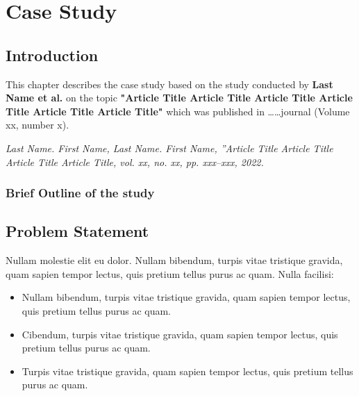 
\chapter{Case Study}\doublespacing %

\label{Chapter3} %



\section{Introduction}
This chapter describes the case study based on the study conducted by \textbf{Last Name et al.} on the topic \textbf{ "Article Title Article Title Article Title Article Title Article Title Article Title" } which was published in \ldots \ldots journal (Volume xx, number x).


\textit{Last Name. First Name, Last Name. First Name, ”Article Title Article Title Article Title Article
Title, vol. xx, no. xx, pp. xxx–xxx, 2022.}


\subsection{Brief Outline of the study}
\lipsum[22-25]



\section{Problem Statement}
Nullam molestie elit eu dolor. Nullam bibendum, turpis vitae tristique gravida, quam sapien tempor lectus, quis pretium tellus purus ac quam. Nulla facilisi: 

\begin{itemize}

  \item Nullam bibendum, turpis vitae tristique gravida, quam sapien tempor lectus, quis pretium tellus purus ac quam.
  
  \item Cibendum, turpis vitae tristique gravida, quam sapien tempor lectus, quis pretium tellus purus ac quam.
  
  \item Turpis vitae tristique gravida, quam sapien tempor lectus, quis pretium tellus purus ac quam. 
  
\end{itemize}

